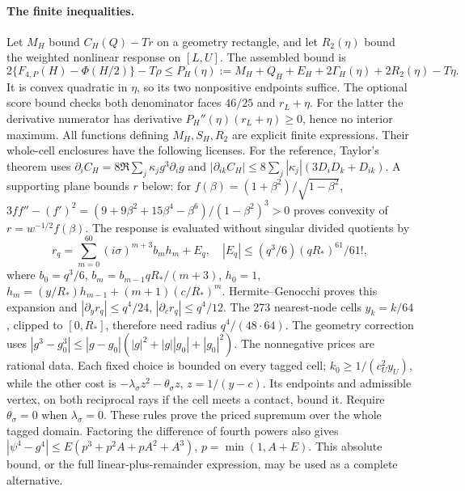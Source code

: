 \paragraph{The finite inequalities.}
Let $M_H$ bound $C_H(Q)-Tr$ on a geometry rectangle, and let
$R_2(\eta)$ bound the weighted nonlinear response on $[L,U]$.
The assembled bound is
\begin{equation}\label{j:finite:n4low}
 2\{F_{4,P}(H)-\Phi(H/2)\}-T\rho
 \le P_H(\eta):=M_H+Q_H+E_H+2\Gamma_H(\eta)+2R_2(\eta)-T\eta.
\end{equation}
It is convex quadratic in $\eta$, so its two nonpositive endpoints
suffice. The optional score bound checks both denominator faces
$46/25$ and $r_L+\eta$. For the latter the derivative numerator has
derivative $P_H''(\eta)(r_L+\eta)\ge0$, hence no interior maximum.
All functions defining $M_H,S_H,R_2$ are explicit finite expressions.
Their whole-cell enclosures have the following licenses.
For the reference, Taylor's theorem uses
$\partial_i C_H=8\Re\sum_j\kappa_jg^3\partial_i g$ and
$|\partial_{ik}C_H|\le8\sum_j|\kappa_j|(3D_iD_k+D_{ik})$.
A supporting plane bounds $r$ below: for
$f(\beta)=(1+\beta^2)/\sqrt{1-\beta^2}$,
$3ff''-(f')^2=(9+9\beta^2+15\beta^4-\beta^6)/(1-\beta^2)^3>0$
proves convexity of $r=w^{-1/2}f(\beta)$.
The response is evaluated without singular divided quotients by
\[
 r_q=\sum_{m=0}^{60}(i\sigma)^{m+3}b_mh_m+E_q,\quad
 |E_q|\le(q^3/6)(qR_*)^{61}/61!,
\]
where $b_0=q^3/6$, $b_m=b_{m-1}qR_* /(m+3)$,
$h_0=1$, $h_m=(y/R_*)h_{m-1}+(m+1)(c/R_*)^m$.
Hermite--Genocchi proves this expansion and
$|\partial_y r_q|\le q^4/24$, $|\partial_c r_q|\le q^4/12$.
The 273 nearest-node cells $y_k=k/64$, clipped to $[0,R_*]$,
therefore need radius $q^4/(48\cdot64)$.
The geometry correction uses
$|g^3-g_0^3|\le|g-g_0|(|g|^2+|g||g_0|+|g_0|^2)$.
The nonnegative prices are rational data. Each fixed choice is bounded
on every tagged cell; $k_0\ge1/(c_U^2y_U)$, while the other cost is
$-\lambda_\sigma z^2-\theta_\sigma z$, $z=1/(y-c)$.
Its endpoints and admissible vertex, on both reciprocal rays if the
cell meets a contact, bound it. Require $\theta_\sigma=0$ when
$\lambda_\sigma=0$. These rules prove the priced supremum over the
whole tagged domain. Factoring the difference of fourth powers also gives
$|\psi^4-g^4|\le E(p^3+p^2A+pA^2+A^3)$, $p=\min(1,A+E)$.
This absolute bound, or the full linear-plus-remainder expression, may be
used as a complete alternative.

